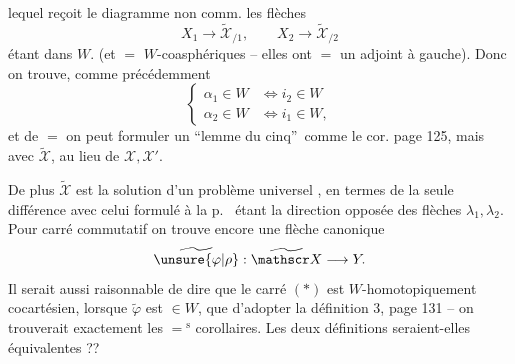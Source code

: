 lequel reçoit le diagramme non comm.
les flèches
\[
X_1\to\widetilde{\mathscr X}_{/1},\qquad X_2\to\widetilde{\mathscr X}_{/2}
\]
étant dans $W$. (et $=$ $W$-coasphériques -- elles ont $=$ un adjoint à gauche). Donc on trouve, comme précédemment
\[
\left\{\begin{aligned}
\alpha_1\in W&\Longleftrightarrow i_2\in W\\
\alpha_2\in W&\Longleftrightarrow i_1\in W ,
\end{aligned}\right.
\]
et de $=$ on peut  formuler un \textquotedblleft lemme du cinq\textquotedblright\ comme le cor. page 125, mais avec $\widetilde{\mathscr X}$,  au lieu de $\mathscr X,\mathscr X'$. 

De plus $\widetilde{\mathscr X}$ est la solution d'un problème universel , en termes de 
la seule différence avec celui formulé à la p.~ étant la direction opposée des flèches $\lambda_1,\lambda_2$. Pour  carré commutatif
on trouve encore une flèche canonique
\[
\widetilde{\unsure{\varphi|\rho}}:\widetilde{\mathscr X}\longrightarrow Y .
\]
Il serait  aussi raisonnable de dire que le carré $(\ast)$ est $W$-homotopiquement cocartésien, lorsque $\widetilde\varphi$ est $\in W$, que d'adopter la définition 3, page 131 -- on trouverait exactement les $=\!{}^{\mathrm{s}}$ corollaires. Les deux définitions seraient-elles équivalentes ??


